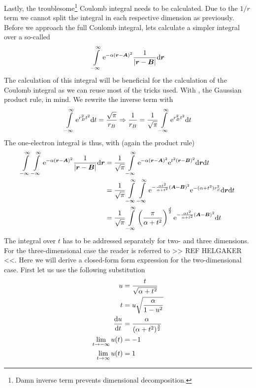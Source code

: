    Lastly, the troublesome\footnote{Damn inverse term prevents dimensional
    decomposition.} Coulomb integral needs to be calculated. Due to the $1/r$
    term we cannot split the integral in each respective dimension as
    previously. Before we approach the full Coulomb integral, lets calculate a
    simpler integral over a so-called 
        \begin{equation}
            \int\limits^{\infty}_{-\infty} \mathrm{e}^{-\alpha\left(\boldsymbol{{r}} - \boldsymbol{{A}}\right)^2}
            \frac{1}{\abs{\boldsymbol{{r}} - \boldsymbol{{B}}}} \mathrm{d}\boldsymbol{{r}}
        \end{equation}
    The calculation of this integral will be beneficial for the calculation of
    the Coulomb integral as we can reuse most of the tricks used. With
    , the Gaussian product rule, in mind. We
    rewrite the inverse term with
        \begin{equation}
            \int\limits^{\infty}_{-\infty} \mathrm{e}^{r^2_B t^2} \mathrm{d} t = \frac{\sqrt{\pi}}{r_B} \Rightarrow
            \frac{1}{r_B} = \frac{1}{\sqrt{\pi}} \int\limits^{\infty}_{-\infty} \mathrm{e}^{r^2_Bt^2} \mathrm{d} t
            \label{eq:onelectronTrick1}
        \end{equation}
    The one-electron integral is thus, with (again
    the product rule)
        \begin{align}
            \int\limits^{\infty}_{-\infty}\int\limits^{\infty}_{-\infty} \mathrm{e}^{-\alpha\left(\boldsymbol{{r}} - \boldsymbol{{A}}\right)^2}
            \frac{1}{\abs{\boldsymbol{{r}} - \boldsymbol{{B}}}} \mathrm{d}\boldsymbol{{r}} &=
            \frac{1}{\sqrt{\pi}}\int\limits^{\infty}_{-\infty} \mathrm{e}^{-\alpha\left(\boldsymbol{{r}} -
            \boldsymbol{{A}}\right)^2} \mathrm{e}^{t^2(\boldsymbol{{r}} - \boldsymbol{{B}})^2} \mathrm{d}\boldsymbol{{r}} \mathrm{d}
            t \nonumber \\
            &= \frac{1}{\sqrt{\pi}} \int\limits^{\infty}_{-\infty}\int\limits^{\infty}_{-\infty} \mathrm{e}^{-\frac{\alpha
            t^2}{\alpha + t^2}\left(\boldsymbol{{A}} - \boldsymbol{{B}}\right)^2}
            \mathrm{e}^{-(\alpha+t^2)r^2_S} \mathrm{d}\boldsymbol{{r}} \mathrm{d} t \nonumber \\
            &= \frac{1}{\sqrt{\pi}} \int\limits^{\infty}_{-\infty} \left(\frac{\pi}{\alpha +
            t^2}\right)^{\frac{d}{2}} \mathrm{e}^{-\frac{\alpha t^2}{\alpha +
            t^2}\left(\boldsymbol{{A}} - \boldsymbol{{B}}\right)^2} \mathrm{d} t
        \end{align}
    The integral over $t$ has to be addressed separately for two- and three
    dimensions. For the three-dimensional case the reader is referred to >> REF
    HELGAKER <<. Here we will derive a closed-form form expression for the
    two-dimensional case. First let us use the following substitution
        \begin{equation}
            \begin{aligned}
                u &= \frac{t}{\sqrt{\alpha+t^2}} \\
                t &= u\sqrt{\frac{\alpha}{1-u^2}} \\
                \frac{\mathrm{d} u}{\mathrm{d} t} &= \frac{\alpha}{(\alpha + t^2)^{\frac{3}{2}}} \\
                \lim\limits_{t\rightarrow -\infty} u(t) &= -1 \\
                \lim\limits_{t\rightarrow \infty} u(t) &= 1 \\
            \end{aligned}
        \end{equation}

